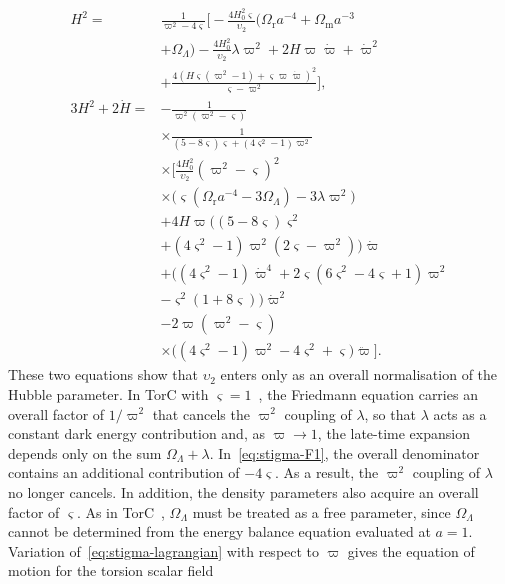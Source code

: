 \documentclass[aps,prd,reprint,preprintnumbers,showpacs,floatfix,nofootinbib,superscriptaddress]{revtex4-2}
\newcommand{\OL}{\Omega_\Lambda}
\newcommand{\cpr}{\varpi}
\begin{document}
\begin{align}
	H^2 = {}& \frac{1}{\cpr^2-4\varsigma} \Bigg[-\frac{4 H_0^2\varsigma}{\upsilon_2}\Big(\Omega_\mathrm{r}a^{-4}+\Omega_{\mathrm{m}}a^{-3} \nonumber\\
		& +\Omega_{\Lambda}\Big) - \frac{4 H_0^2}{\upsilon_2} \lambda \varpi^2 + 2 H \cpr\dot{\cpr} + \dot{\cpr}^2 \nonumber\\
		& + \frac{4\left(H\varsigma\left(\cpr^2-1\right)+\varsigma\cpr\dot{\cpr}\right)^2}{\varsigma-\cpr^2}\Bigg], \label{eq:stigma-F1} \\
	3H^2+2\dot H ={}& -\frac{1}{\varpi^2 (\varpi^2 - \varsigma)} \nonumber\\
		& \times \frac{1}{(5-8\varsigma)\varsigma + (4 \varsigma^2 - 1) \varpi^2} \nonumber\\
		& \times \Bigg[\frac{4 H_0^2}{\upsilon_2} (\varpi^2 - \varsigma)^2 \nonumber\\
		& \times \Big(\varsigma(\Omega_\mathrm{r} a^{-4} - 3 \Omega_\Lambda) - 3\lambda \varpi^2\Big) \nonumber\\
		&+ 4 H \varpi \Big((5 -8 \varsigma)\varsigma^2 \nonumber\\
		& + (4 \varsigma^2 - 1) \varpi^2 (2 \varsigma - \varpi^2 )\Big) \dot{\varpi} \nonumber\\
		&+ \Big((4 \varsigma^2 -1) \dot{\varpi}^4 + 2 \varsigma (6 \varsigma^2 - 4 \varsigma +1) \varpi^2 \nonumber\\
		& - \varsigma^2(1 + 8 \varsigma)\Big) \dot{\varpi}^2 \nonumber \\
		& - 2 \varpi (\varpi^2 - \varsigma) \nonumber\\
		& \times \Big((4 \varsigma^2 - 1) \varpi^2 - 4 \varsigma^2 + \varsigma\Big) \ddot{\varpi} \Bigg]. \label{eq:stigma-F2}
\end{align}
These two equations show that $\upsilon_2$ enters only as an overall normalisation of the Hubble parameter. In TorC with $\varsigma=1$~\citep{Legner:2025hrt, Legner:2026}, the Friedmann equation carries an overall factor of $1/\varpi^2$ that cancels the $\varpi^2$ coupling of $\lambda$, so that $\lambda$ acts as a constant dark energy contribution and, as $\varpi\to1$, the late-time expansion depends only on the sum $\OL+\lambda$. In~\cref{eq:stigma-F1}, the overall denominator contains an additional contribution of $-4\varsigma$. As a result, the $\varpi^2$ coupling of $\lambda$ no longer cancels. In addition, the density parameters also acquire an overall factor of $\varsigma$. As in TorC~\citep{Legner:2025hrt}, $\Omega_\Lambda$ must be treated as a free parameter, since $\Omega_\Lambda$ cannot be determined from the energy balance equation evaluated at $a=1$. Variation of~\cref{eq:stigma-lagrangian} with respect to $\cpr$ gives the equation of motion for the torsion scalar field
\end{document}
